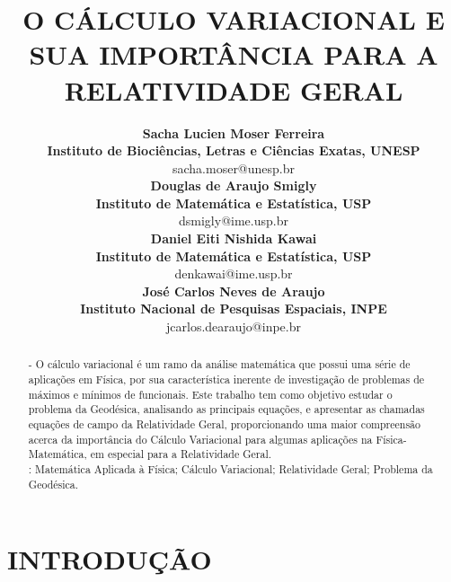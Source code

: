 \documentclass[a4,11pt]{report}
\begin{document}
\title{\bf O CÁLCULO VARIACIONAL E SUA IMPORTÂNCIA PARA A RELATIVIDADE GERAL}

\author{
 {\large  {\bf Sacha Lucien Moser Ferreira}}\\
 {\small {\bf  Instituto de Biociências, Letras e Ciências Exatas, UNESP}} \\
 {\small sacha.moser@unesp.br} \\
 {\large {\bf Douglas de Araujo Smigly}}\\
 {\small{\bf Instituto de Matemática e Estatística, USP}} \\
 {\small dsmigly@ime.usp.br}\\
 {\large {\bf Daniel Eiti Nishida Kawai}}\\
 {\small{\bf Instituto de Matemática e Estatística, USP}} \\
 {\small denkawai@ime.usp.br}\\
 {\large {\bf José Carlos Neves de Araujo}}\\
 {\small{\bf Instituto Nacional de Pesquisas Espaciais, INPE}} \\
 {\small jcarlos.dearaujo@inpe.br}\\
 }

\criartitulo

\begin{abstract}
{ \color{blue}{\bf  Resumo}}- O cálculo variacional é um ramo da análise matemática que possui uma série de aplicações em Física, por sua característica inerente de investigação de problemas de máximos e mínimos de funcionais. Este trabalho tem como objetivo estudar o problema da Geodésica, analisando as principais equações, e apresentar as chamadas equações de campo da Relatividade Geral, proporcionando uma maior compreensão acerca da importância do Cálculo Variacional para algumas aplicações na Física-Matemática, em especial para a Relatividade Geral.
\noindent \\

{\color{blue}{\bf Palavras-Chaves}}: Matemática Aplicada à Física; Cálculo Variacional; Relatividade Geral; Problema da Geodésica.

\end{abstract}


\section{INTRODUÇÃO}

\end{document}
